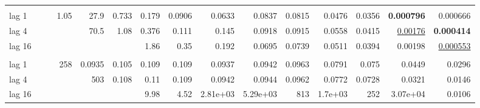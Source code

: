 \begin{table}[t]
\begin{tabular}{lrrrrrrrrrrrrrr}
\addlinespace
\multicolumn{15}{l}{\textit{MLP}} \\
\quad lag 1 &  &  & 1.05 & 27.9 & 0.733 & 0.179 & 0.0906 & 0.0633 & 0.0837 & 0.0815 & 0.0476 & 0.0356 & \textbf{0.000796} & 0.000666 \\
\quad lag 4 &  &  &  & 70.5 & 1.08 & 0.376 & 0.111 & 0.145 & 0.0918 & 0.0915 & 0.0558 & 0.0415 & \underline{0.00176} & \textbf{0.000414} \\
\quad lag 16 &  &  &  &  &  & 1.86 & 0.35 & 0.192 & 0.0695 & 0.0739 & 0.0511 & 0.0394 & 0.00198 & \underline{0.000553} \\
\addlinespace
\multicolumn{15}{l}{\textit{VARX}} \\
\quad lag 1 &  &  & 258 & 0.0935 & 0.105 & 0.109 & 0.109 & 0.0937 & 0.0942 & 0.0963 & 0.0791 & 0.075 & 0.0449 & 0.0296 \\
\quad lag 4 &  &  &  & 503 & 0.108 & 0.11 & 0.109 & 0.0942 & 0.0944 & 0.0962 & 0.0772 & 0.0728 & 0.0321 & 0.0146 \\
\quad lag 16 &  &  &  &  &  & 9.98 & 4.52 & 2.81e+03 & 5.29e+03 & 813 & 1.7e+03 & 252 & 3.07e+04 & 0.0106 \\
\bottomrule
\end{tabular}
\end{table}